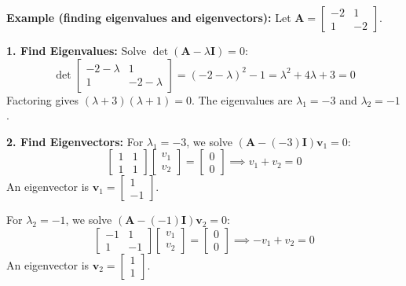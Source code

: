 \begin{exampleBox}
    \textbf{Example (finding eigenvalues and eigenvectors):}
    Let $\mathbf{A} = \begin{bmatrix} -2 & 1 \\ 1 & -2 \end{bmatrix}$.

    \textbf{1. Find Eigenvalues:}
    Solve $\det(\mathbf{A} - \lambda \mathbf{I}) = 0$:
    $$ \det \begin{bmatrix} -2-\lambda & 1 \\ 1 & -2-\lambda \end{bmatrix} = (-2-\lambda)^2 - 1 = \lambda^2 + 4\lambda + 3 = 0 $$
    Factoring gives $(\lambda+3)(\lambda+1)=0$. The eigenvalues are $\lambda_1 = -3$ and $\lambda_2 = -1$.

    \textbf{2. Find Eigenvectors:}
    For $\lambda_1 = -3$, we solve $(\mathbf{A} - (-3)\mathbf{I})\mathbf{v}_1 = 0$:
    $$ \begin{bmatrix} 1 & 1 \\ 1 & 1 \end{bmatrix} \begin{bmatrix} v_1 \\ v_2 \end{bmatrix} = \begin{bmatrix} 0 \\ 0 \end{bmatrix} \implies v_1 + v_2 = 0 $$
    An eigenvector is $\mathbf{v}_1 = \begin{bmatrix} 1 \\ -1 \end{bmatrix}$.

    For $\lambda_2 = -1$, we solve $(\mathbf{A} - (-1)\mathbf{I})\mathbf{v}_2 = 0$:
    $$ \begin{bmatrix} -1 & 1 \\ 1 & -1 \end{bmatrix} \begin{bmatrix} v_1 \\ v_2 \end{bmatrix} = \begin{bmatrix} 0 \\ 0 \end{bmatrix} \implies -v_1 + v_2 = 0 $$
    An eigenvector is $\mathbf{v}_2 = \begin{bmatrix} 1 \\ 1 \end{bmatrix}$.
\end{exampleBox}

